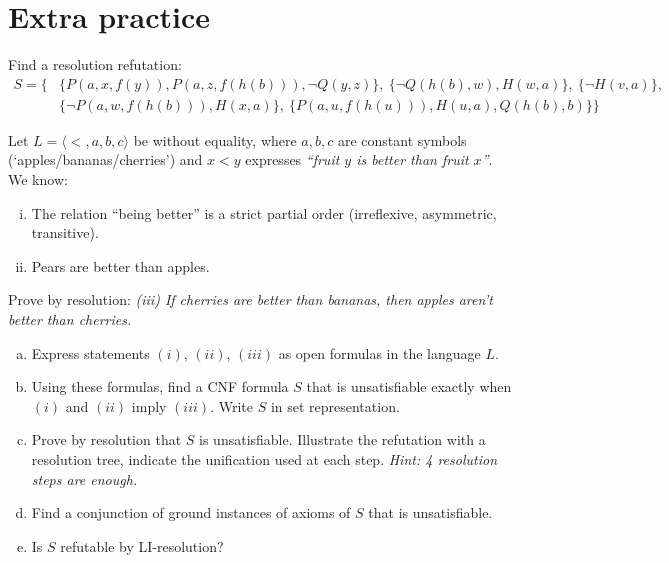         
\section*{Extra practice}


\begin{problem}
    Find a resolution refutation: 
    \begin{align*}
        S=\{
            &\{P(a,x,f(y)),P(a,z,f(h(b))),\neg Q(y,z)\},\
            \{\neg Q(h(b),w),H(w,a)\},\ 
            \{\neg H(v,a)\},\\
            &\{\neg P(a,w,f(h(b))),H(x,a)\},\
            \{P(a,u,f(h(u))),H(u,a),Q(h(b),b)\}            
        \}
    \end{align*}
\end{problem}


\begin{problem}

    Let $L=\langle <, a, b, c\rangle$ be without equality, where $a,b,c$ are constant symbols (`apples/bananas/cherries') and $x < y$ expresses {\it ``fruit $y$ is better than fruit $x$''}. We know:
    \begin{enumerate}[(i)]\it
        \item The relation ``being better'' is a strict partial order (irreflexive, asymmetric, transitive).
        \item Pears are better than apples.
    \end{enumerate}
    Prove by resolution: \emph{(iii) If cherries are better than bananas, then apples aren't better than cherries.}

    \begin{enumerate}[(a)]
    \item Express statements $(i)$, $(ii)$, $(iii)$ as open formulas in the language $L$.
    \item Using these formulas, find a CNF formula $S$ that is unsatisfiable exactly when $(i)$ and $(ii)$ imply $(iii)$. Write $S$ in set representation.
    \item Prove by resolution that $S$ is unsatisfiable. Illustrate the refutation with a resolution tree, indicate the unification used at each step. {\it Hint: 4 resolution steps are enough.}
    \item Find a conjunction of ground instances of axioms of $S$ that is unsatisfiable.
    \item Is $S$ refutable by LI-resolution?
    \end{enumerate}

\end{problem}


